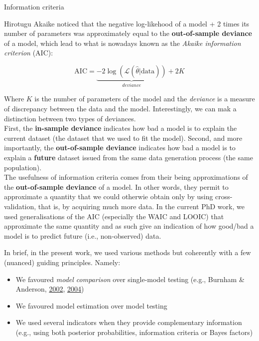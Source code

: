 \documentclass[a4paper,12pt,twoside,openright,oldfontcommands]{memoir}
\providecommand{\tightlist}{%
  \setlength{\itemsep}{0pt}\setlength{\parskip}{0pt}}
\begin{document}
\begin{mybox}[label = IC]{Information criteria}

Hirotugu Akaike noticed that the negative log-likehood of a model + 2 times its number of parameters was approximately equal to the \textbf{out-of-sample deviance} of a model, which lead to what is nowadays known as the \textit{Akaike information criterion} (AIC):

$$\text{AIC} = \underbrace{-2\log(\mathcal{L}(\hat{\theta}|\text{data}))}_{deviance} + 2K$$

Where $K$ is the number of parameters of the model and the \textit{deviance} is a measure of discrepancy between the data and the model. Interestingly, we can mak a distinction between two types of deviances.\\

First, the \textbf{in-sample deviance} indicates how bad a model is to explain the current dataset (the dataset that we used to fit the model). Second, and more importantly, the \textbf{out-of-sample deviance} indicates how bad a model is to explain a \textbf{future} dataset issued from the same data generation process (the same population).\\

The usefulness of information criteria comes from their being approximations of the \textbf{out-of-sample deviance} of a model. In other words, they permit to approximate a quantity that we could otherwie obtain only by using cross-validation, that is, by acquiring much more data. In the current PhD work, we used generalisations of the AIC (especially the WAIC and LOOIC) that approximate the same quantity and as such give an indication of how good/bad a model is to predict future (i.e., non-observed) data.

\end{mybox}

In brief, in the present work, we used various methods but coherently
with a few (nuanced) guiding principles. Namely:

\begin{itemize}
\tightlist
\item
  We favoured \emph{model comparison} over single-model testing (e.g.,
  Burnham \& Anderson, \protect\hyperlink{ref-burnham_model_2002}{2002},
  \protect\hyperlink{ref-burnham_multimodel_2004}{2004})
\item
  We favoured model estimation over model testing
\item
  We used several indicators when they provide complementary information
  (e.g., using both posterior probabilities, information criteria or
  Bayes factors)
\end{itemize}
\end{document}
